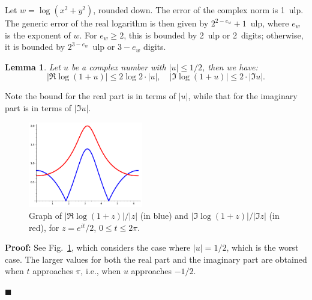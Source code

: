 \documentclass [11pt]{article}
\newcommand {\ulp}[1]{#1~ulp}
\renewcommand {\geq}{\geqslant}
\newtheorem{lemma}[theorem]{Lemma}
\newenvironment{proof}{\noindent \textbf {Proof:}}{{\hspace* {\fill}$\blacksquare$}}
\begin{document}
Let $w = \log (x^2 + y^2)$, rounded down. The error of the complex norm is \ulp{1}. The generic error of the real logarithm is then given by \ulp{$2^{2 - e_w} + 1$}, where $e_w$ is the exponent of $w$. For $e_w \geq 2$, this is bounded by \ulp{2} or 2~digits; otherwise, it is bounded by \ulp{$2^{3 - e_w}$} or $3 - e_w$ digits.

\begin{lemma} \label{lem:logaux}
  Let $u$ be a complex number with $|u| \le 1/2$, then we have:
  \[ |\Re \log(1+u)| \le 2 \log 2 \cdot |u|,
    \quad |\Im \log(1+u)| \le 2 \cdot |\Im u|. \]
\end{lemma}
Note the bound for the real part is in terms of $|u|$, while that for the imaginary
part is in terms of $|\Im u|$.
\begin{figure}[htp]
  \centerline{\includegraphics[width=5cm]{fig_log.pdf}}
  \caption{Graph of $|\Re \log(1+z)|/|z|$ (in blue) and
    $|\Im \log(1+z)|/|\Im z|$ (in red), for $z = e^{i t}/2$,
    $0 \le t \le 2\pi$.} \label{fig_log}
\end{figure}

\begin{proof}
  See Fig.~\ref{fig_log}, which considers the case where $|u|=1/2$,
  which is the worst case.
  The larger values for both the real part
  and the imaginary part are obtained when $t$ approaches $\pi$,
  i.e., when $u$ approaches $-1/2$.

\end{proof}
\end{document}
